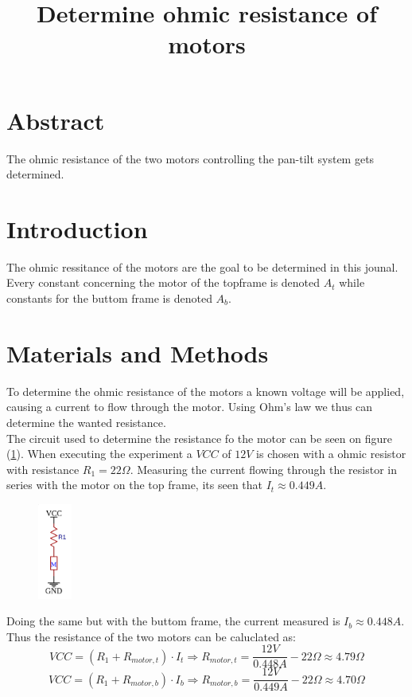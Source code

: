 \documentclass[../../rapport/main]{article}
\title{Determine ohmic resistance of motors}
\begin{document}
\section{Abstract}
The ohmic resistance of the two motors controlling the pan-tilt system gets determined.
\section{Introduction}
The ohmic ressitance of the motors are the goal to be determined in this jounal. Every constant concerning the motor of the topframe is denoted $A_t$ while constants for the buttom frame is denoted $A_b$.
\section{Materials and Methods}
To determine the ohmic resistance of the motors a known voltage will be applied, causing a current to flow through the motor. Using Ohm's law we thus can determine the wanted resistance.\\
The circuit used to determine the resistance fo the motor can be seen on figure (\ref{fig:resistance_circuit}). When executing the experiment a $VCC$ of $12V$ is chosen with a ohmic resistor with resistance $R_1 = 22\Omega$. Measuring the current flowing through the resistor in series with the motor on the top frame, its seen that $I_t \approx 0.449 A$.

\begin{figure}
  \label{fig:resistance_circuit}
  \begin{center}
    \includegraphics[width=0.1\textwidth]{screenshot-2019:05:08:12:43:17.png}
  \end{center}
\end{figure}
Doing the same but with the buttom frame, the current measured is $I_b \approx 0.448 A$. Thus the resistance of the two motors can be caluclated as:
$$VCC = (R_1 + R_{motor,t})\cdot I_t \Rightarrow R_{motor,t} = \frac{12V}{0.448 A}-22\Omega \approx 4.79 \Omega $$
$$VCC = (R_1 + R_{motor,b})\cdot I_b \Rightarrow R_{motor,b} = \frac{12V}{0.449 A}-22\Omega \approx 4.70 \Omega $$
\end{document}
